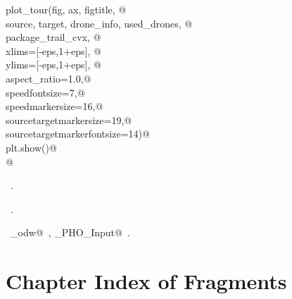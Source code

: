 \documentclass[10.0pt]{report}
\begin{document}
\begin{flushleft}
\begin{minipage}{\linewidth}
\begin{list}{}{}
\mbox{}\verb@    plot_tour(fig, ax, figtitle, @\\
\mbox{}\verb@                source, target, drone_info, used_drones, @\\
\mbox{}\verb@                package_trail_cvx, @\\
\mbox{}\verb@                xlims=[-eps,1+eps], @\\
\mbox{}\verb@                ylims=[-eps,1+eps], @\\
\mbox{}\verb@                aspect_ratio=1.0,@\\
\mbox{}\verb@                speedfontsize=7,@\\
\mbox{}\verb@                speedmarkersize=16,@\\
\mbox{}\verb@                sourcetargetmarkersize=19,@\\
\mbox{}\verb@                sourcetargetmarkerfontsize=14)@\\
\mbox{}\verb@    plt.show()@\\
\mbox{}\verb@ @\\
\mbox{}\verb@@{\NWsep}
\end{list}
\vspace{-1.5ex}
\footnotesize
\begin{list}{}{\setlength{\itemsep}{-\parsep}\setlength{\itemindent}{-\leftmargin}}
\item \NWtxtMacroDefBy\ .
\item \NWtxtMacroRefIn\ .
\item \NWtxtIdentsUsed\nobreak\  \verb@algo_odw@\nobreak\ , \verb@Single_PHO_Input@\nobreak\ .
\item{}
\end{list}
\end{minipage}\vspace{4ex}
\end{flushleft}




\section{Chapter Index of Fragments}
\end{document}
